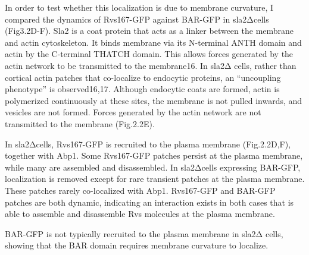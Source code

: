 	\vspace{5mm}
In order to test whether this localization is due to membrane curvature, I compared the dynamics of Rvs167-GFP against BAR-GFP in sla2Δcells (Fig3.2D-F). Sla2 is a coat protein that acts as a linker between the membrane and actin cytoskeleton. It binds membrane via its N-terminal ANTH domain and actin by the C-terminal THATCH domain. This allows forces generated by the actin network to be transmitted to the membrane16. In sla2Δ cells, rather than cortical actin patches that co-localize to endocytic proteins, an “uncoupling phenotype” is observed16,17. Although endocytic coats are formed, actin is polymerized continuously at these sites, the membrane is not pulled inwards, and vesicles are not formed. Forces generated by the actin network are not transmitted to the membrane (Fig.2.2E).

\newpage
In sla2Δcells, Rvs167-GFP is recruited to the plasma membrane (Fig.2.2D,F), together with Abp1. Some Rvs167-GFP patches persist at the plasma membrane, while many are assembled and disassembled. In sla2Δcells expressing BAR-GFP, localization is removed except for rare transient patches at the plasma membrane. These patches rarely co-localized with Abp1. Rvs167-GFP and BAR-GFP patches are both dynamic, indicating an interaction exists in both cases that is able to assemble and disassemble Rvs molecules at the plasma membrane. 

	\vspace{5mm}
BAR-GFP is not typically recruited to the plasma membrane in sla2Δ cells, showing that the BAR domain requires membrane curvature to localize. 



